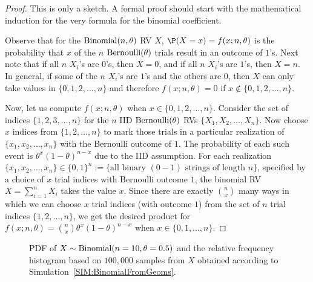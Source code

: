 {\scriptsize
\begin{proof} This is only a sketch. A formal proof should start with the mathematical induction for the very formula for the binomial coefficient.

Observe that for the $\mbox{{\rm Binomial}}(n,\theta)$ RV $X$, $\P(X=x) = f(x;n,\theta)$ is the probability that $x$ of the $n$ $\mbox{{\rm Bernoulli}}(\theta)$ trials result in an outcome of $1$'s.  Next note that if all $n$ $X_i$'s are $0$'s, then $X=0$, and if all $n$ $X_i$'s are $1$'s, then $X=n$.  In general, if some of the $n$ $X_i$'s are $1$'s and the others are $0$, then $X$ can only take values in $\{0,1,2,\ldots,n\}$ and therefore $f(x;n,\theta)=0$ if $x \notin \{0,1,2,\ldots,n\}$.

Now, let us compute $f(x;n,\theta)$ when $x\in\{0,1,2,\ldots,n\}$.  Consider the set of indices $\{1,2,3,\ldots,n\}$ for the $n$ IID $\mbox{{\rm Bernoulli}}(\theta)$ RVs $\{X_1,X_2,\ldots,X_n\}$.  Now choose $x$ indices from $\{1,2,\ldots,n\}$ to mark those trials in a particular realization of $\{x_1,x_2,\ldots,x_n\}$ with the Bernoulli outcome of $1$.  The probability of each such event is $\theta^x (1-\theta)^{n-x}$ due to the IID assumption.  For each realization $\{x_1,x_2,\ldots,x_n\} \in \{0,1\}^{n} := \{ \text{all binary $(0-1)$ strings of length $n$}\}$, specified by a choice of $x$ trial indices with Bernoulli outcome $1$, the binomial RV $X=\sum_{i=1}^n X_i$ takes the value $x$.  Since there are exactly $\binom{n}{x}$ many ways in which we can choose $x$ trial indices (with outcome $1$) from the set of $n$ trial indices $\{1,2,\ldots,n\}$, we get the desired product for $f(x; n,\theta) = \binom{n}{x} \theta^x (1-\theta)^{n-x}$ when $x \in \{0,1,\ldots,n\}$.
\end{proof}
}
\begin{figure}[htpb]
\caption{PDF of $X \sim \mbox{{\rm Binomial}}(n=10,\theta=0.5)$ and the relative frequency histogram based on $100,000$ samples from $X$ obtained according to Simulation~\ref{SIM:BinomialFromGeoms}.\label{F:PlotPdfSim10000HistBinomByGeomsn10thetaHalf}} %
\centering   {}
\end{figure}

